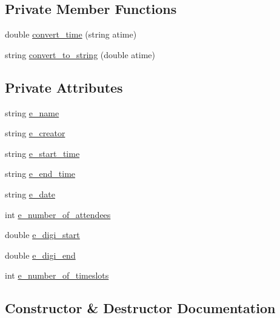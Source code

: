 \subsection*{Private Member Functions}
\begin{DoxyCompactItemize}
\item 
double \hyperlink{class_event_a9446b101ed9d3fc30517e6d49784f0e8}{convert\+\_\+time} (string atime)
\item 
string \hyperlink{class_event_a8b44e4b7aabb33750c46fe75c1f667d7}{convert\+\_\+to\+\_\+string} (double atime)
\end{DoxyCompactItemize}
\subsection*{Private Attributes}
\begin{DoxyCompactItemize}
\item 
string \hyperlink{class_event_a1a14f0254ecf8a9b047ef3a6fdbd7c5c}{e\+\_\+name}
\item 
string \hyperlink{class_event_ae3987340f5890193cba3e2d5b3a5d795}{e\+\_\+creator}
\item 
string \hyperlink{class_event_a95f673d61a2a65a3a596cac4fbeb1f83}{e\+\_\+start\+\_\+time}
\item 
string \hyperlink{class_event_aa4d3cc50d5c3c67c689af507af1f9cad}{e\+\_\+end\+\_\+time}
\item 
string \hyperlink{class_event_ad561caba64fcce6c406af8ac40845b5b}{e\+\_\+date}
\item 
int \hyperlink{class_event_a7322a346321deb08645ab2152b1fc2ab}{e\+\_\+number\+\_\+of\+\_\+attendees}
\item 
double \hyperlink{class_event_a44032054621d2aa43329ac6b40d85733}{e\+\_\+digi\+\_\+start}
\item 
double \hyperlink{class_event_a9abcd7ce82863c2fb15395b6923dd4ea}{e\+\_\+digi\+\_\+end}
\item 
int \hyperlink{class_event_a6784c7edd91dc873c16b420c00799f0b}{e\+\_\+number\+\_\+of\+\_\+timeslots}
\end{DoxyCompactItemize}


\subsection{Constructor \& Destructor Documentation}
\mbox{\label{class_event_ac53d5eea0fae7018bfc240544c99bec0}} 
